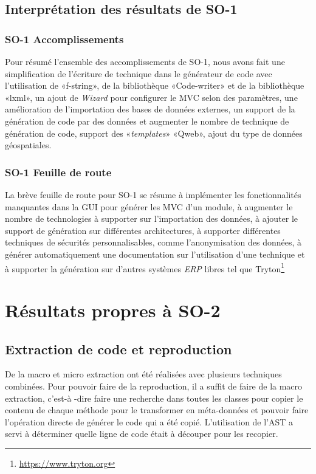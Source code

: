 
\subsection{Interprétation des résultats de SO-1}

\subsubsection{SO-1 Accomplissements}
Pour résumé l'ensemble des accomplissements de SO-1, nous avons fait une simplification de l’écriture de technique dans le générateur de code avec l’utilisation de «f-string», de la bibliothèque «Code-writer» et de la bibliothèque «lxml», un ajout de \textit{Wizard} pour configurer le MVC selon des paramètres, une amélioration de l’importation des bases de données externes, un support de la génération de code par des données et augmenter le nombre de technique de génération de code, support des «\textit{templates}» «Qweb», ajout du type de données géospatiales.

\subsubsection{SO-1 Feuille de route}
La brève feuille de route pour SO-1 se résume à implémenter les fonctionnalités manquantes dans la GUI pour générer les MVC d’un module, à augmenter le nombre de technologies à supporter sur l'importation des données, à ajouter le support de génération sur différentes architectures, à supporter différentes techniques de sécurités personnalisables, comme l’anonymisation des données, à générer automatiquement une documentation sur l’utilisation d’une technique et à supporter la génération sur d’autres systèmes \textit{ERP} libres tel que Tryton\footnote{\url{https://www.tryton.org}}

\section{Résultats propres à SO-2}

\subsection {Extraction de code et reproduction}

De la macro et micro extraction ont été réalisées avec plusieurs techniques combinées. Pour pouvoir faire de la reproduction, il a suffit de faire de la macro extraction, c'est-à -dire faire une recherche dans toutes les classes pour copier le contenu de chaque méthode pour le transformer en méta-données et pouvoir faire l’opération directe de générer le code qui a été copié. L’utilisation de l’AST a servi à déterminer quelle ligne de code était à découper pour les recopier.

